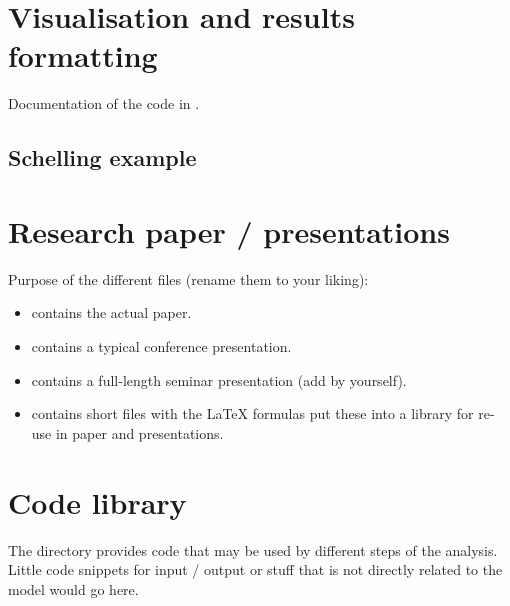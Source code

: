 \documentclass[a4paper,11pt,english]{sphinxmanual}
\begin{document}
\chapter{Visualisation and results formatting}
\label{\detokenize{final:visualisation-and-results-formatting}}\label{\detokenize{final:final}}\label{\detokenize{final::doc}}
Documentation of the code in .


\section{Schelling example}
\label{\detokenize{final:schelling-example}}

\chapter{Research paper / presentations}
\label{\detokenize{paper:research-paper-presentations}}\label{\detokenize{paper:paper}}\label{\detokenize{paper::doc}}
Purpose of the different files (rename them to your liking):
\begin{itemize}
\item {} 
 contains the actual paper.

\item {} 
 contains a typical conference presentation.

\item {} 
 contains a full-length seminar presentation (add by yourself).

\item {} 
 contains short files with the LaTeX formulas \textendash{} put these into a library for re-use in paper and presentations.

\end{itemize}


\chapter{Code library}
\label{\detokenize{library:code-library}}\label{\detokenize{library:library}}\label{\detokenize{library::doc}}
The directory  provides code that may be used by different steps of the analysis. Little code snippets for input / output or stuff that is not directly related to the model would go here.
\end{document}
